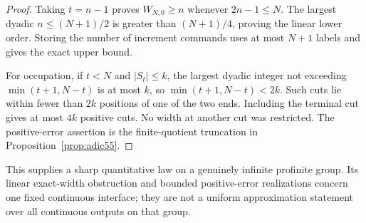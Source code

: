 \begin{proof}
Taking $t=n-1$ proves $W_{N,0}\ge n$ whenever $2n-1\le N$. The largest dyadic $n\le(N+1)/2$ is greater than $(N+1)/4$, proving the linear lower order. Storing the number of increment commands uses at most $N+1$ labels and gives the exact upper bound.

For occupation, if $t<N$ and $|S_t|\le k$, the largest dyadic integer not exceeding $\min(t+1,N-t)$ is at most $k$, so $\min(t+1,N-t)<2k$. Such cuts lie within fewer than $2k$ positions of one of the two ends. Including the terminal cut gives at most $4k$ positive cuts. No width at another cut was restricted. The positive-error assertion is the finite-quotient truncation in Proposition~\ref{prop:adic55}.
\end{proof}
This supplies a sharp quantitative law on a genuinely infinite profinite group. Its linear exact-width obstruction and bounded positive-error realizations concern one fixed continuous interface; they are not a uniform approximation statement over all continuous outputs on that group.
